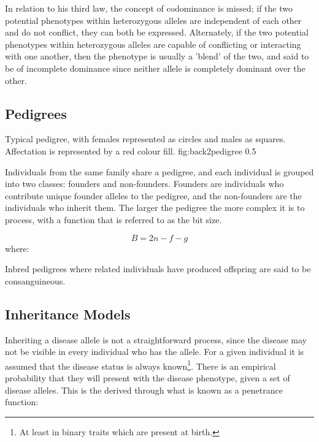 In relation to his third law, the concept of \gls{codominance} is missed; if the two potential phenotypes within heterozygous alleles are independent of each other and do not conflict, they can both be expressed. Alternately, if the two potential phenotypes within heterozygous alleles are capable of conflicting or interacting with one another, then the phenotype is usually a 'blend' of the two, and said to be of \gls{incomplete dominance} since neither allele is completely dominant over the other.


\subsection{Pedigrees}

	{Typical pedigree, with females represented as circles and males as squares. Affectation is represented by a red colour fill.}
	{fig:back2pedigree}
	{0.5}

Individuals from the same family share a \gls{pedigree}, and each individual is grouped into two classes: \gls{founders} and \gls{non-founders}. 
Founders are individuals who contribute unique \gls{founder alleles} to the pedigree, and the non-founders are the individuals who inherit them.
The larger the pedigree the more complex it is to process, with a function that is referred to as the \gls{bit size}.

\begin{equation}
\label{bitsize}
B = 2n -f -g
\end{equation}
where:

\begin{description}
\end{description}

Inbred pedigrees where related individuals have produced offspring are said to be \gls{consanguineous}.


\subsection{Inheritance Models}

Inheriting a disease allele is not a straightforward process, since the disease may not be visible in every individual who has the allele. For a given individual it is assumed that the disease status is always known\footnote{At least in binary traits which are present at birth.}.  There is an empirical probability that they will present with the disease phenotype, given a set of disease alleles. This is the derived through what is known as a penetrance function:

